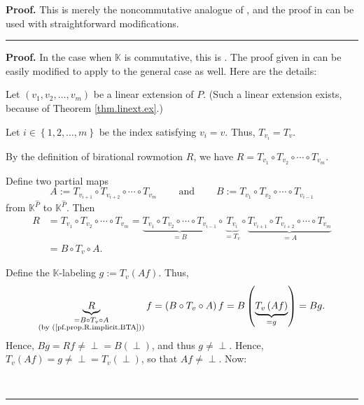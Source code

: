 \documentclass[numbers=enddot,12pt,final,onecolumn,notitlepage]{scrartcl}%
\theoremstyle{definition}
\newenvironment{verlong}{}{}
\newenvironment{vershort}{}{}
\newcommand{\undf}{\operatorname*{\bot}}
\newenvironment{proof}[1][Proof]{\noindent\textbf{#1.} }{\ \rule{0.5em}{0.5em}}
\begin{document}
\begin{vershort}
\begin{proof}
This is merely the noncommutative analogue of \cite[Proposition 19]%
{bir-row-1}, and the proof in \cite{bir-row-1} can be used with
straightforward modifications.
\end{proof}
\end{vershort}

\begin{verlong}
\begin{proof}
In the case when $\mathbb{K}$ is commutative, this is \cite[Proposition
2.16]{bir-row-arxiv}. The proof given in \cite{bir-row-arxiv} can be easily
modified to apply to the general case as well. Here are the details:

Let $\left(  v_{1},v_{2},\ldots,v_{m}\right)  $ be a linear extension of $P$.
(Such a linear extension exists, because of Theorem \ref{thm.linext.ex}.)

Let $i\in\left\{  1,2,\ldots,m\right\}  $ be the index satisfying $v_{i}=v$.
Thus, $T_{v_{i}}=T_{v}$.

By the definition of birational rowmotion $R$, we have $R=T_{v_{1}}\circ
T_{v_{2}}\circ\cdots\circ T_{v_{m}}$.

Define two partial maps%
\[
A:=T_{v_{i+1}}\circ T_{v_{i+2}}\circ\cdots\circ T_{v_{m}}%
\ \ \ \ \ \ \ \ \ \ \text{and}\ \ \ \ \ \ \ \ \ \ B:=T_{v_{1}}\circ T_{v_{2}%
}\circ\cdots\circ T_{v_{i-1}}%
\]
from $\mathbb{K}^{\widehat{P}}$ to $\mathbb{K}^{\widehat{P}}$. Then%
\begin{align}
R  &  =T_{v_{1}}\circ T_{v_{2}}\circ\cdots\circ T_{v_{m}}=\underbrace{T_{v_{1}%
}\circ T_{v_{2}}\circ\cdots\circ T_{v_{i-1}}}_{=B}\circ\underbrace{T_{v_{i}}%
}_{=T_{v}}\circ\underbrace{T_{v_{i+1}}\circ T_{v_{i+2}}\circ\cdots\circ
T_{v_{m}}}_{=A}\nonumber\\
&  =B\circ T_{v}\circ A. \label{pf.prop.R.implicit.BTA}%
\end{align}


Define the $\mathbb{K}$-labeling $g:=T_{v}\left(  Af\right)  $. Thus,
\[
\underbrace{R}_{\substack{=B\circ T_{v}\circ A\\\text{(by
(\ref{pf.prop.R.implicit.BTA}))}}}f=\left(  B\circ T_{v}\circ A\right)
f=B\left(  \underbrace{T_{v}\left(  Af\right)  }_{=g}\right)  =Bg.
\]
Hence, $Bg=Rf\neq\undf=B\left(  \undf\right)  $, and thus $g\neq\undf$. Hence,
$T_{v}\left(  Af\right)  =g\neq\undf=T_{v}\left(  \undf\right)  $, so that
$Af\neq\undf$. Now:


\end{proof}
\end{verlong}
\end{document}
